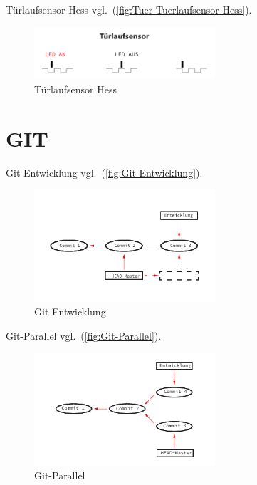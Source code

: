 Türlaufsensor Hess vgl.~(\autoref{fig:Tuer-Tuerlaufsensor-Hess}).

\begin{figure}[!hb]%
\centering
\includegraphics[width=0.6\textwidth]{Grafiken/Tuer-Tuerlaufsensor-Hess.pdf}
\caption{Türlaufsensor Hess}
\label{fig:Tuer-Tuerlaufsensor-Hess}%
\end{figure}

\section{GIT}\label{git}

Git-Entwicklung vgl.~(\autoref{fig:Git-Entwicklung}).

\begin{figure}[!hb]%
\centering
\includegraphics[width=0.6\textwidth]{Grafiken/Git-Entwicklung.pdf}
\caption{Git-Entwicklung}
\label{fig:Git-Entwicklung}%
\end{figure}

Git-Parallel vgl.~(\autoref{fig:Git-Parallel}).

\begin{figure}[!hb]%
\centering
\includegraphics[width=0.6\textwidth]{Grafiken/Git-Parallel.pdf}
\caption{Git-Parallel}
\label{fig:Git-Parallel}%
\end{figure}

